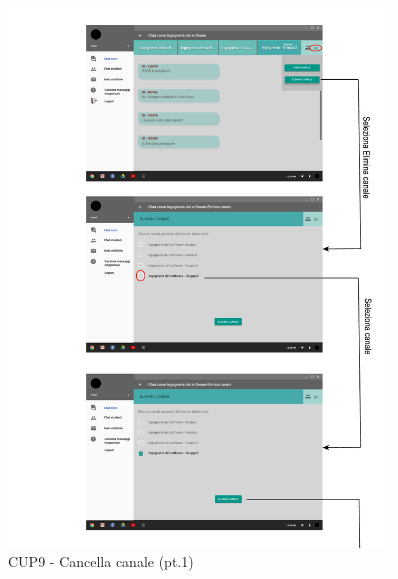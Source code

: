 \begin{figure}
	\centering
	\includegraphics[width=0.9\textwidth]{imgs/gruppo6/activities/act_cup9_cancella_canale1.pdf}
	\caption{CUP9 - Cancella canale (pt.1)}
	\label{fig:cup9}
\end{figure}

